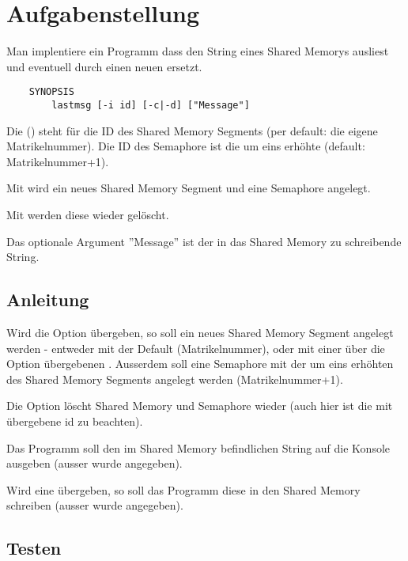 




\section*{Aufgabenstellung}


Man implentiere ein Programm dass den String eines Shared Memorys ausliest und
eventuell durch einen neuen ersetzt.
\begin{verbatim}
    SYNOPSIS
        lastmsg [-i id] [-c|-d] ["Message"]
\end{verbatim}

Die  () steht für die ID des Shared Memory Segments (per default: die eigene Matrikelnummer).
Die ID des Semaphore ist die um eins erhöhte (default: Matrikelnummer+1).

Mit  wird ein neues Shared Memory Segment und eine Semaphore angelegt.

Mit  werden diese wieder gelöscht.

Das optionale Argument ''Message'' ist der in das Shared Memory zu schreibende String.

\subsection*{Anleitung}

Wird die Option  übergeben, so soll ein neues Shared Memory Segment angelegt
werden - entweder mit der Default  (Matrikelnummer), oder mit einer über die Option 
übergebenen . Ausserdem soll eine Semaphore mit der um eins erhöhten  des
Shared Memory Segments angelegt werden (Matrikelnummer+1).

Die Option  löscht Shared Memory und Semaphore wieder (auch hier ist die mit
 übergebene id zu beachten).

Das Programm soll den im Shared Memory befindlichen String auf die Konsole
ausgeben (ausser  wurde angegeben).

Wird eine  übergeben, so soll das Programm diese in den Shared
Memory schreiben (ausser  wurde angegeben).

\subsection*{Testen}

